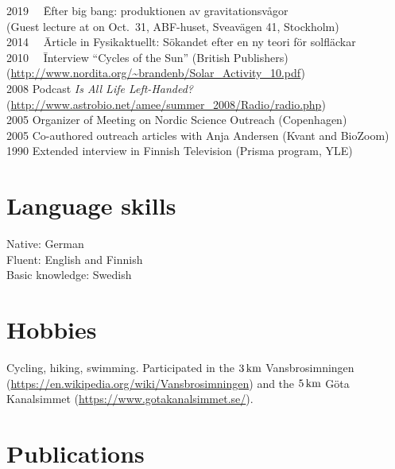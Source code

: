\documentclass{article}
\newcommand{\km}{\,{\rm km}}
\begin{document}
\begin{tabbing}
2019 ~~\= Efter big bang: produktionen av gravitationsv{\aa}gor\\
       \> (Guest lecture at on Oct.\ 31, ABF-huset, Sveav\"agen 41, Stockholm)\\
2014 ~~\= Article in Fysikaktuellt: S\"okandet efter en ny teori f\"or solfl\"ackar\\
2010 ~~\= Interview ``Cycles of the Sun'' (British Publishers)\\
       \> (\url{http://www.nordita.org/~brandenb/Solar_Activity_10.pdf})\\
2008   \> Podcast {\it Is All Life Left-Handed?}\\
       \> (\url{http://www.astrobio.net/amee/summer_2008/Radio/radio.php})\\
2005   \> Organizer of Meeting on Nordic Science Outreach (Copenhagen) \\
2005   \> Co-authored outreach articles with Anja Andersen (Kvant and BioZoom)\\
1990   \> Extended interview in Finnish Television (Prisma program, YLE)\\
\end{tabbing}
\vspace{-8mm}

\section*{Language skills}

\noindent
Native: German\\
Fluent: English and Finnish\\
Basic knowledge: Swedish\\

\section*{Hobbies}

Cycling, hiking, swimming.
Participated in the $3\km$ Vansbrosimningen
(\url{https://en.wikipedia.org/wiki/Vansbrosimningen})
and the $5\km$ G\"ota Kanalsimmet (\url{https://www.gotakanalsimmet.se/}).

\vspace{8mm}

\section*{Publications}

%
\end{document}
